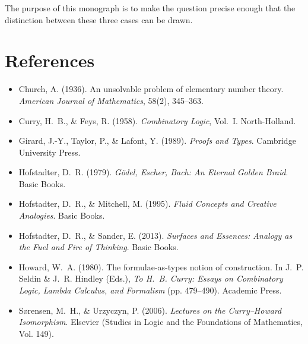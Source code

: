 \documentclass[12pt, a4paper]{article}
\theoremstyle{plain}
\theoremstyle{definition}
\theoremstyle{remark}
\begin{document}
The purpose of this monograph is to make the question precise enough
that the distinction between these three cases can be drawn.

\newpage
\section*{References}

\begin{itemize}[leftmargin=1.8em, itemsep=0.4em]

  \item Church, A. (1936). An unsolvable problem of elementary number
        theory. \textit{American Journal of Mathematics}, 58(2), 345--363.

  \item Curry, H.~B., \& Feys, R. (1958). \textit{Combinatory Logic},
        Vol.~I. North-Holland.

  \item Girard, J.-Y., Taylor, P., \& Lafont, Y. (1989).
        \textit{Proofs and Types}. Cambridge University Press.

  \item Hofstadter, D.~R. (1979). \textit{Gödel, Escher, Bach:
        An Eternal Golden Braid}. Basic Books.

  \item Hofstadter, D.~R., \& Mitchell, M. (1995).
        \textit{Fluid Concepts and Creative Analogies}.
        Basic Books.

  \item Hofstadter, D.~R., \& Sander, E. (2013).
        \textit{Surfaces and Essences: Analogy as the Fuel and Fire
        of Thinking}. Basic Books.

  \item Howard, W.~A. (1980). The formulae-as-types notion of
        construction. In J.~P. Seldin \& J.~R. Hindley (Eds.),
        \textit{To H.~B. Curry: Essays on Combinatory Logic, Lambda
        Calculus, and Formalism} (pp. 479--490). Academic Press.

  \item Sørensen, M.~H., \& Urzyczyn, P. (2006).
        \textit{Lectures on the Curry--Howard Isomorphism}.
        Elsevier (Studies in Logic and the Foundations of Mathematics,
        Vol. 149).


\end{itemize}
\end{document}
